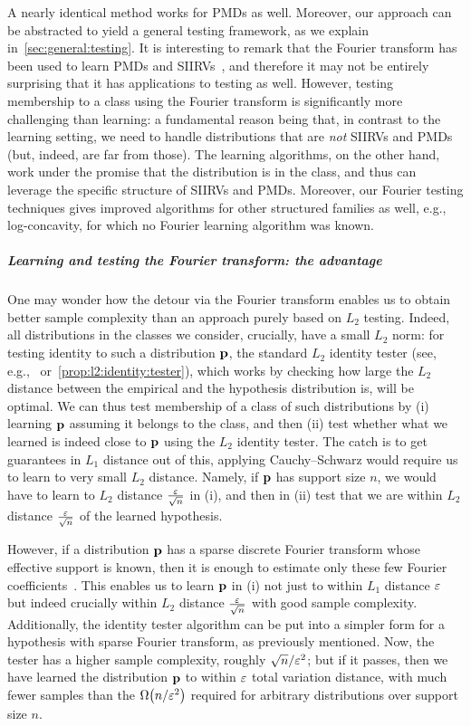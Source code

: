 A nearly identical method works for PMDs as well. Moreover, our approach can be abstracted 
to yield a general testing framework, as we explain in~\cref{sec:general:testing}. It is interesting to
remark that the Fourier transform has been used to learn PMDs and SIIRVs~\cite{DKS:15, DKT:15, DKS:15b, DDKT:16}, and therefore it may not be entirely surprising that it has applications to testing as well. 
However, testing membership to a class using the Fourier transform is significantly more challenging than learning: a fundamental reason being that, in contrast to the learning 
setting, we need to handle distributions that are \emph{not} SIIRVs and PMDs (but, indeed, are far from those). The learning algorithms, on the other hand, work under the promise that the distribution is in the class, and thus can leverage the specific structure of SIIRVs and PMDs. Moreover, our Fourier testing techniques gives
improved algorithms for other structured families as well, e.g., log-concavity, for which no Fourier learning algorithm was known.

\subparagraph{Learning and testing the Fourier transform: the advantage}

One may wonder how the detour via the Fourier transform enables us to obtain better sample complexity than an approach purely based on $L_2$ testing.  Indeed, all distributions in the classes we consider, crucially, have a small $L_2$ norm: for testing identity to such a distribution $\mathbf{p}$, the standard $L_2$ identity tester (see, e.g.,~\cite{CDVV:14} or~\cref{prop:l2:identity:tester}), which works by checking how large the $L_2$ distance between the empirical and the hypothesis distribution is, will be optimal. We can thus test membership of a class of such distributions by (i) learning $\mathbf{p}$ assuming it belongs to the class, and then (ii) test whether what we learned is indeed close to $\mathbf{p}$ using the $L_2$ identity tester. The catch is to get guarantees in $L_1$ distance out of this, applying Cauchy--Schwarz would require us to learn to very small $L_2$ distance. Namely, if $\mathbf{p}$ has support size $n$, we would have to learn to $L_2$ distance $\frac{\varepsilon}{\sqrt{n}}$ in (i), and then in (ii) test that we are within $L_2$ distance $\frac{\varepsilon}{\sqrt{n}}$ of the learned hypothesis.

However, if a distribution $\mathbf{p}$ has a sparse discrete Fourier transform whose effective support is known, then it is enough to estimate only these few Fourier coefficients~\cite{DKS:15,DKS:15c}. This enables us to learn $\mathbf{p}$ in (i) not just to within $L_1$ distance $\varepsilon$ but indeed crucially within $L_2$ distance $\frac{\varepsilon}{\sqrt{n}}$ with good sample complexity. Additionally, the identity tester algorithm can be put into a simpler form for a hypothesis with sparse Fourier transform, as previously mentioned. Now, the tester has a higher sample complexity, roughly $\sqrt{n}/\varepsilon^2$; but if it passes, then we have learned the distribution $\mathbf{p}$ to within $\varepsilon$ total variation distance, with much fewer samples than the $\bigOmega{n/\eps^2}$ required for arbitrary distributions over support size $n$.

